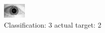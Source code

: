 \begin{figure}[h!]
\begin{center}
\includegraphics[width=0.60\columnwidth]{figures/ID1784_class_3_target_2.png}
\end{center}
\caption{ Classification: 3 actual target: 2}
\label{fig:ID1784_class_3_target_2}
\end{figure}
